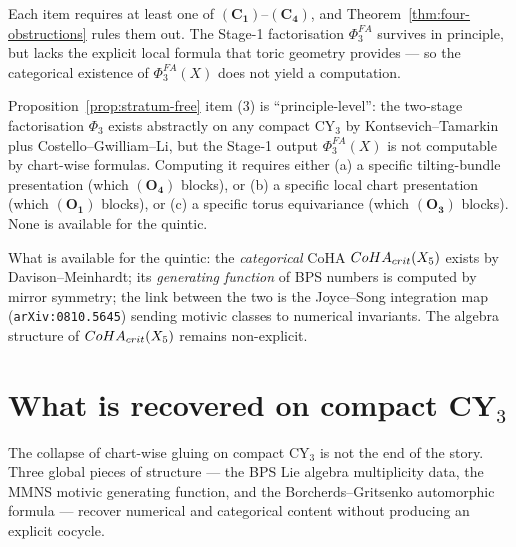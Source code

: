 Each item requires at least one of $(\mathbf{C_1})$--$(\mathbf{C_4})$,
and Theorem~\ref{thm:four-obstructions} rules them out. The Stage-1
factorisation $\Phi^{FA}_3$ survives in principle, but lacks the
explicit local formula that toric geometry provides --- so the categorical
existence of $\Phi^{FA}_3(X)$ does not yield a computation.

\begin{remark}
\label{rem:principle-level}
Proposition~\ref{prop:stratum-free} item (3) is ``principle-level'': the
two-stage factorisation $\Phi_3$ exists abstractly on any compact CY$_3$
by Kontsevich--Tamarkin plus Costello--Gwilliam--Li, but the Stage-1
output $\Phi^{FA}_3(X)$ is not computable by chart-wise formulas.
Computing it requires either (a) a specific tilting-bundle presentation
(which $(\mathbf{O_4})$ blocks), or (b) a specific local chart
presentation (which $(\mathbf{O_1})$ blocks), or (c) a specific torus
equivariance (which $(\mathbf{O_3})$ blocks). None is available for the
quintic.

What is available for the quintic: the \emph{categorical} CoHA
$CoHA_{crit}(X_5)$ exists by Davison--Meinhardt; its
\emph{generating function} of BPS numbers is computed by mirror
symmetry; the link between the two is the Joyce--Song integration map
(\texttt{arXiv:0810.5645}) sending motivic classes to numerical
invariants. The algebra structure of $CoHA_{crit}(X_5)$
remains non-explicit.
\end{remark}

\section{What is recovered on compact CY$_3$}
\label{sec:recovery}

The collapse of chart-wise gluing on compact CY$_3$ is not the end of
the story. Three global pieces of structure --- the BPS Lie algebra
multiplicity data, the MMNS motivic generating function, and the
Borcherds--Gritsenko automorphic formula --- recover numerical and
categorical content without producing an explicit cocycle.

